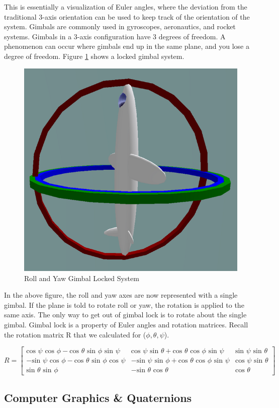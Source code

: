  This is essentially a visualization of Euler angles, where the deviation from the traditional 3-axis orientation can be used to keep track of the orientation of the system.
 Gimbals are commonly used in gyroscopes, aeronautics, and rocket systems.
 Gimbals in a 3-axis configuration have 3 degrees of freedom.
 A phenomenon can occur where gimbals end up in the same plane, and you lose a degree of freedom.
 Figure \ref{fig:gimlock} shows a locked gimbal system.

 \begin{figure}[H]
 \centering
 \includegraphics[width = .75\textwidth]{Figures/gimbal_lock.png}
 \caption{Roll and Yaw Gimbal Locked System}
 \label{fig:gimlock}
 \end{figure}

 In the above figure, the roll and yaw axes are now represented with a single gimbal.
 If the plane is told to rotate roll or yaw, the rotation is applied to the same axis.
 The only way to get out of gimbal lock is to rotate about the single gimbal.
 Gimbal lock is a property of Euler angles and rotation matrices.
 Recall the rotation matrix R that we calculated for ($\phi, \theta, \psi$).
 
 $$
 R =
 \begin{bmatrix}
 \text{cos }\psi \text{ cos }\phi- \text{cos }\theta \text{ sin }\phi \text{ sin }\psi & \text{cos } \psi \text{ sin }\theta + \text{cos }\theta \text{ cos }\phi \text{ sin }\psi & \text{sin }\psi \text{ sin }\theta \\
 -\text{sin }\psi \text{ cos }\phi - \text{cos }\theta \text{ sin }\phi \text{ cos }\psi & - \text{sin }\psi \text{ sin }\phi + \text{cos }\theta \text{ cos }\phi \text{ sin }\psi & \text{cos }\psi \text{ sin }\theta \\
 \text{sin }\theta \text{ sin }\phi & - \text{sin }\theta \text{ cos }\theta & \text{cos } \theta
 \end{bmatrix}
 $$



\subsection{Computer Graphics \& Quaternions}
